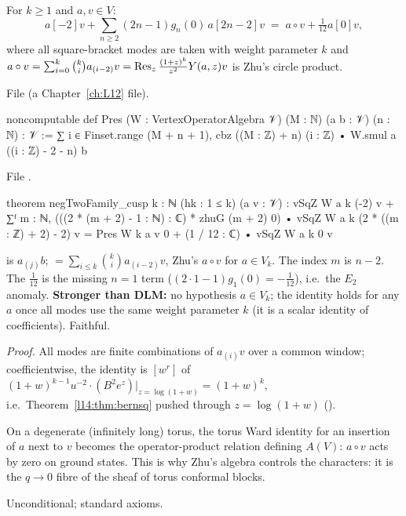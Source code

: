 \begin{theorem}\label{l14:thm:negtwo}
For $k\ge1$ and $a,v\in V$:
\begin{equation*}
  a[-2]v + \sum_{n\ge2}(2n-1)g_n(0)\,a[2n-2]v \;=\; a\circ v + \tfrac1{12}a[0]v,
\end{equation*}
where all square-bracket modes are taken with weight parameter $k$ and $a\circ v = \sum_{i=0}^{k}\binom ki a_{(i-2)}v =
\operatorname{Res}_z\frac{(1+z)^k}{z^2}Y(a,z)v$ is Zhu's circle product.
\end{theorem}
\noindent File  (a Chapter~\ref{ch:L12} file).
\begin{leancode}
noncomputable def Pres (W : VertexOperatorAlgebra 𝒱) (M : ℕ) (a b : 𝒱) (n : ℕ) : 𝒱 :=
  ∑ i ∈ Finset.range (M + n + 1), cbz ((M : ℤ) + n) (i : ℤ) • W.smul a ((i : ℤ) - 2 - n) b
\end{leancode}
\noindent File .
\begin{leancode}
theorem negTwoFamily_cusp {k : ℕ} (hk : 1 ≤ k) (a v : 𝒱) :
    vSqZ W a k (-2) v
        + ∑ᶠ m : ℕ, (((2 * (m + 2) - 1 : ℕ) : ℂ) * zhuG (m + 2) 0)
            • vSqZ W a k (2 * ((m : ℤ) + 2) - 2) v
      = Pres W k a v 0 + (1 / 12 : ℂ) • vSqZ W a k 0 v
\end{leancode}
\begin{dictionary}
 is $a_{(j)}b$;  $=\sum_{i\le k}\binom ki a_{(i-2)}v$, Zhu's $a\circ v$ for
$a\in V_k$. The  index $m$ is $n-2$. The $\frac1{12}$ is the missing $n=1$ term ($(2\cdot1-1)g_1(0) = -\frac1{12}$),
i.e.\ the $E_2$ anomaly. \textbf{Stronger than DLM:} no hypothesis $a\in V_k$; the identity holds for any $a$ once all modes use
the same weight parameter $k$ (it is a scalar identity of coefficients). Faithful.
\end{dictionary}
\noindent\emph{Proof.} All modes are finite combinations of $a_{(i)}v$ over a common window; coefficientwise, the identity is
$[w^{r}]$ of $(1+w)^{k-1}u^{-2}\cdot(B^2e^z)|_{z=\log(1+w)} = (1+w)^k$, i.e.\ Theorem~\ref{l14:thm:bernsq} pushed through
$z = \log(1+w)$ ().
\begin{physics}
On a degenerate (infinitely long) torus, the torus Ward identity for an insertion of $a$ next to $v$ becomes the
operator-product relation defining $A(V)$: $a\circ v$ acts by zero on ground states. This is why Zhu's algebra controls the
characters: it is the $q\to0$ fibre of the sheaf of torus conformal blocks.
\end{physics}
\begin{status}
Unconditional; standard axioms.
\end{status}

